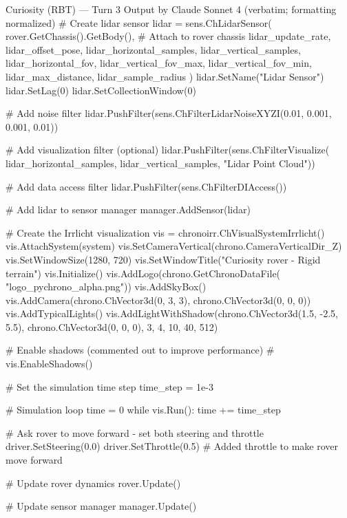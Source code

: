 \documentclass{ieeeaccess}
\begin{document}
\begin{appendices}
\begin{CodeBlock}[breakable]{Curiosity (RBT) --- Turn 3 Output by Claude Sonnet 4 (verbatim; formatting normalized)}
      # Create lidar sensor
      lidar = sens.ChLidarSensor(
          rover.GetChassis().GetBody(),  # Attach to rover chassis
          lidar_update_rate,
          lidar_offset_pose,
          lidar_horizontal_samples,
          lidar_vertical_samples,
          lidar_horizontal_fov,
          lidar_vertical_fov_max,
          lidar_vertical_fov_min,
          lidar_max_distance,
          lidar_sample_radius
      )
      lidar.SetName("Lidar Sensor")
      lidar.SetLag(0)
      lidar.SetCollectionWindow(0)
      
      # Add noise filter
      lidar.PushFilter(sens.ChFilterLidarNoiseXYZI(0.01, 0.001, 0.001, 0.01))
      
      # Add visualization filter (optional)
      lidar.PushFilter(sens.ChFilterVisualize(
        lidar_horizontal_samples, lidar_vertical_samples, "Lidar Point Cloud"))
      
      # Add data access filter
      lidar.PushFilter(sens.ChFilterDIAccess())
      
      # Add lidar to sensor manager
      manager.AddSensor(lidar)
      
      # Create the Irrlicht visualization
      vis = chronoirr.ChVisualSystemIrrlicht()
      vis.AttachSystem(system)
      vis.SetCameraVertical(chrono.CameraVerticalDir_Z)
      vis.SetWindowSize(1280, 720)
      vis.SetWindowTitle("Curiosity rover - Rigid terrain")
      vis.Initialize()
      vis.AddLogo(chrono.GetChronoDataFile(
      "logo_pychrono_alpha.png"))
      vis.AddSkyBox()
      vis.AddCamera(chrono.ChVector3d(0, 3, 3), chrono.ChVector3d(0, 0, 0))
      vis.AddTypicalLights()
      vis.AddLightWithShadow(chrono.ChVector3d(1.5, -2.5, 5.5), chrono.ChVector3d(0, 0, 0), 3, 4, 10, 40, 512)
      
      # Enable shadows (commented out to improve performance)
      # vis.EnableShadows()
      
      # Set the simulation time step
      time_step = 1e-3
      
      # Simulation loop
      time = 0
      while vis.Run():
          time += time_step
      
          # Ask rover to move forward - set both steering and throttle
          driver.SetSteering(0.0)
          driver.SetThrottle(0.5)  # Added throttle to make rover move forward
      
          # Update rover dynamics
          rover.Update()
      
          # Update sensor manager
          manager.Update()
      

\end{CodeBlock}
\end{appendices}
\end{document}
